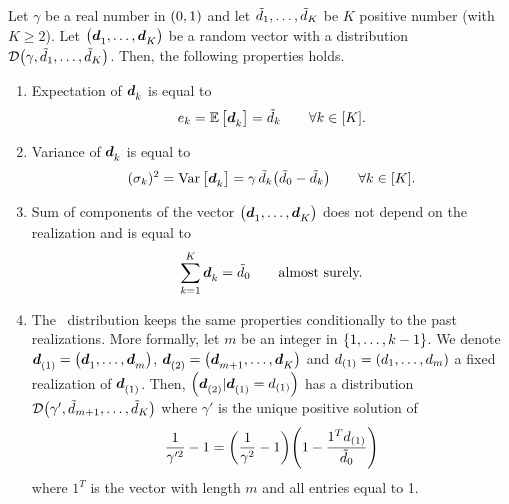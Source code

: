 \begin{prop}\label{prop:demand-distribution:properties}
Let $\gamma$ be a real number in $\bracket{0,1}$ and let $\tilde{d}_1,\ldots,\tilde{d}_K$ be $K$ positive number (with $K\ge2$).
Let $\bracket{\va\demand_1,\ldots,\va\demand_K}$ be a random vector with a \distrib distribution $\cD\bracket{\gamma,\tilde{\demand}_1,\ldots,\tilde{\demand}_K}$.
Then, the following properties holds.
\begin{enumerate}
  \item\label{enum:PDP:random-demand-property:expectation}
  Expectation of $\va\demand_k$ is equal to
  \begin{equation}
    e_k = \espe\sqbracket{\va\demand_k} = \tilde{\demand}_k\qquad\forall k\in\range{K}.
  \end{equation}
  \item\label{enum:PDP:random-demand-property:variance}
  Variance of $\va\demand_k$ is equal to
  \begin{equation}\label{eq:PDP:numerical-experiments:demand:variance}
    (\sigma_k)^2=\vari\sqbracket{\va\demand_k}=\gamma\,\tilde{\demand}_k\bracket{\tilde{\demand}_0-\tilde{\demand}_k}\qquad\forall k\in\range{K}.
  \end{equation}
  \item\label{enum:PDP:random-demand-property:constant-volume}
  Sum of components of the vector $\bracket{\va\demand_1,\ldots,\va\demand_K}$ does not depend on the realization and is equal to
  \begin{equation}
    \sum_{k=1}^{K}\va\demand_k = \tilde{\demand}_0\qquad\mbox{almost surely.}
  \end{equation}
  \item\label{enum:PDP:random-demand-property:past-conditional}
  The \distrib\ distribution keeps the same properties conditionally to the past realizations.
  More formally, let $m$ be an integer in $\range[1]{k-1}$. We denote $\va\demand_{(1)}=\bracket{\va\demand_1,\ldots,\va\demand_m}$, $\va\demand_{(2)}=\bracket{\va\demand_{m+1},\ldots,\va\demand_K}$ and $\demand_{(1)}=\bracket{\demand_1,\ldots,\demand_m}$ a fixed realization of $\va\demand_{(1)}$.
  Then, $\bracket{\va\demand_{(2)}|\va\demand_{(1)}=\demand_{(1)}}$ has a \distrib distribution $\cD\bracket{\gamma',\tilde{\demand}_{m+1},\ldots,\tilde{\demand}_K}$
  where $\gamma'$ is the unique positive solution of
  \begin{equation}\label{eq:PDP:random-demand-property:past-conditional:gamma}
    \frac{1}{\gamma'^2}-1 = \bracket{\frac{1}{\gamma^2}-1}\bracket{1-\frac{1^T\demand_{(1)}}{\tilde{\demand}_0}}
  \end{equation}
  where $1^T$ is the vector with length $m$ and all entries equal to 1. 
\end{enumerate}
\end{prop}


